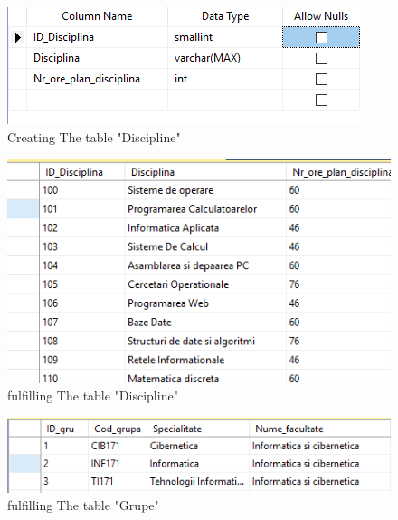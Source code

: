\documentclass[12pt]{article}
\begin{document}
        \begin{figure}[H]
                \centering
                \includegraphics[width=.95\textwidth]{img2.png}
                \caption{Creating The table "Discipline" }
        \end{figure}
        \vspace{0.5 cm}

        
        \begin{figure}[H]
                \centering
                \includegraphics[width=.95\textwidth]{img3.png}
                \caption{fulfilling The table "Discipline"}
        \end{figure}
        \vspace{0.5 cm}

        
        \begin{figure}[H]
                \centering
                \includegraphics[width=.95\textwidth]{img4.png}
                \caption{fulfilling The table "Grupe"}
        \end{figure}
        \vspace{0.5 cm}

        \newpage 
\end{document}
